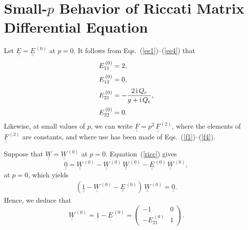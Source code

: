 \documentclass[12pt,prb,aps,notitlepage]{revtex4-1}
\begin{document}
\section{Small-$p$ Behavior of Riccati Matrix Differential Equation}
Let $\underline{\underline{E}} = \underline{\underline{E}}^{\,(0)}$ at $p=0$.
It follows from Eqs.~(\ref{ee1})--(\ref{ee4})  that
\begin{align}
E_{11}^{\,(0)} &= 2,\\[0.5ex]
E_{12}^{\,(0)}&=0,\\[0.5ex]
E_{21}^{\,(0)} &= - \frac{2\,{\rm i}\,Q_e}{g+{\rm i}\,Q_e},\label{e210}\\[0.5ex]
E_{22}^{\,(0)}&= 0.
\end{align}
Likewise, at small values of $p$, we can write $\underline{\underline{F}} =p^2\, \underline{\underline{F}}^{\,(2)}$,
where the elements of  $\underline{\underline{F}}^{\,(2)}$ are constants, and where use has been made of Eqs.~(\ref{f1})--(\ref{f4}). 

Suppose that  $\underline{\underline{W}}= \underline{\underline{W}}^{\,(0)}$ at $p=0$.
Equation~(\ref{ricc}) gives
\begin{equation}
\underline{\underline{0}}= \underline{\underline{W}}^{\,(0)}-\underline{\underline{W}}^{\,(0)}\,\underline{\underline{W}}^{\,(0)}- 
\underline{\underline{E}}^{\,(0)}\,\underline{\underline{W}}^{\,(0)},
\end{equation}
at $p=0$, which yields
\begin{align}
( \underline{\underline{1}}-\underline{\underline{W}}^{\,(0)}-\underline{\underline{E}}^{\,(0)})\,\underline{\underline{W}}^{\,(0)} = \underline{\underline{0}}.
\end{align}
Hence, we deduce that 
\begin{equation}\label{w0def}
\underline{\underline{W}}^{\,(0)} =  \underline{\underline{1}}-\underline{\underline{E}}^{\,(0)} =  \left(\begin{array}{cc} -1&0\\-E_{21}^{\,(0)}&1\end{array}\right).
\end{equation}
\end{document}
